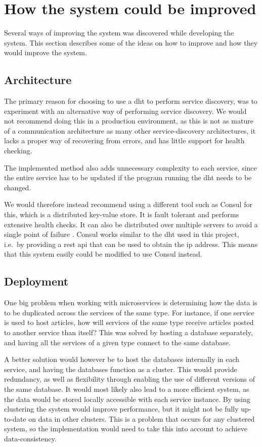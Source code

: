 \section{How the system could be improved}
Several ways of improving the system was discovered while developing the system. This section describes some of the ideas on how to improve and how they would improve the system.

\subsection{Architecture}
The primary reason for choosing to use a \acrshort{dht} to perform service discovery, was to experiment with an alternative way of performing service discovery. We would not recommend doing this in a production environment, as this is not as mature of a communication architecture as many other service-discovery architectures, it lacks a proper way of recovering from errors, and has little support for health checking.

The implemented method also adds unnecessary complexity to each service, since the entire service has to be updated if the program running the \acrshort{dht} needs to be changed.

We would therefore instead recommend using a different tool such as Consul for this, which is a distributed key-value store. It is fault tolerant and performs extensive health checks. It can also be distributed over multiple servers to avoid a single point of failure \citep{consulMicroservice}.
Consul works similar to the \acrshort{dht} used in this project, i.e.\ by providing a \acrshort{rest} \acrshort{api} that can be used to obtain the \acrshort{ip} address. This means that this system easily could be modified to use Consul instead.

\subsection{Deployment}
One big problem when working with microservices is determining how the data is to be duplicated across the services of the same type. For instance, if one service is used to host articles, how will services of the same type receive articles posted to another service than itself? This was solved by hosting a database separately, and having all the services of a given type connect to the same database.

A better solution would however be to host the databases internally in each service, and having the databases function as a cluster. This would provide redundancy, as well as flexibility through enabling the use of different versions of the same database. It would most likely also lead to a more efficient system, as the data would be stored locally accessible with each service instance. By using clustering the system would improve performance, but it might not be fully up-to-date on data in other clusters. This is a problem that occurs for any clustered system, so the implementation would need to take this into account to achieve data-consistency.

